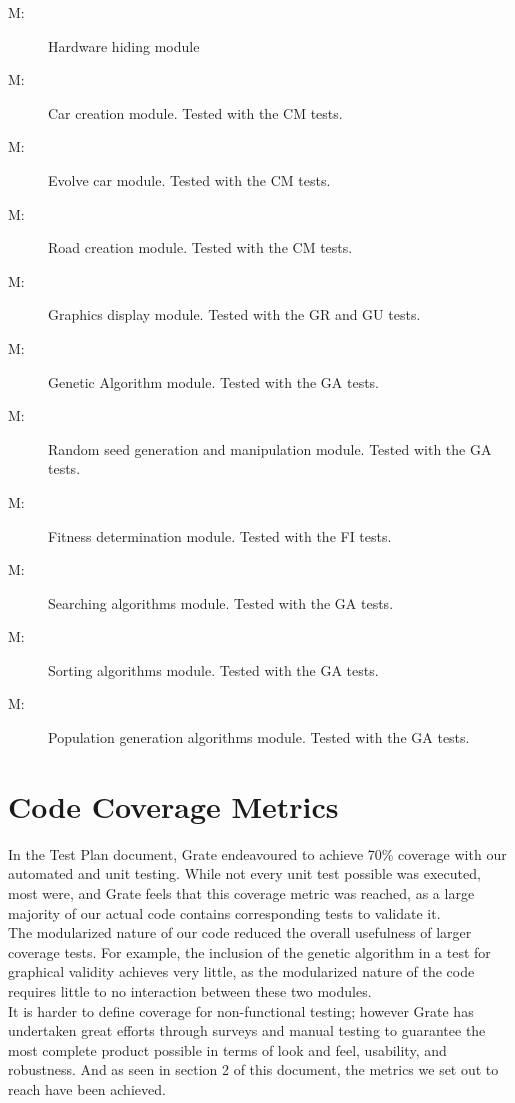 \documentclass[12pt, titlepage]{article}
\newcounter{mnum}
\newcommand{\mthemnum}{M\themnum}
\begin{document}
\begin{description}
\item [ \mthemnum \label{mHardware}:] Hardware hiding 
module
\item [ \mthemnum \label{mCreateCar}:]  Car creation 
module. Tested with the CM tests.
\item [ \mthemnum \label{mEvolveCar}:] Evolve car module. 
Tested with the CM tests.
\item [ \mthemnum \label{mCreateRoad}:] Road creation 
module. Tested with the CM tests.
\item [ \mthemnum \label{mGraphicsDisplay}:] Graphics 
display module. Tested with the GR and GU tests.
\item [ \mthemnum \label{mGeneticAlgorithm}:] Genetic 
Algorithm module. Tested with the GA tests.
\item [ \mthemnum \label{mRandomSeed}:] Random seed 
generation and manipulation module. Tested with the GA tests.
\item [ \mthemnum \label{mFitness}:] Fitness determination 
module. Tested with the FI tests.
\item [ \mthemnum \label{mSearching}:] Searching algorithms 
module. Tested with the GA tests.
\item [ \mthemnum \label{mSorting}:] Sorting algorithms 
module. Tested with the GA tests.
\item [ \mthemnum \label{mPopulationGeneration}:] 
Population generation algorithms module. Tested with the GA tests.
\end{description}


\section{Code Coverage Metrics}

In the Test Plan document, Grate endeavoured to achieve 70\% coverage with our 
automated and unit testing. While not every unit test possible was executed, 
most were, and Grate feels that this coverage metric was reached, as a large 
majority of our actual code contains corresponding tests to validate it. \\

The modularized nature of our code reduced the overall usefulness of larger 
coverage 
tests. For example, the inclusion of the genetic algorithm in a test for 
graphical validity achieves very little, as the modularized nature of the code 
requires little to no interaction between these two modules.\\

It is harder to define coverage for non-functional testing; however Grate has 
undertaken great efforts through surveys and manual testing to guarantee the 
most complete product possible in terms of look and feel, usability, and 
robustness. And as seen in section 2 of this document,  the metrics we set out 
to reach have been achieved.
\end{document}
